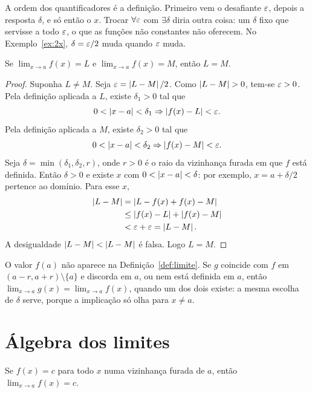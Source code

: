 \documentclass[11pt,a4paper]{article}
\begin{document}
A ordem dos quantificadores \'e a defini\c{c}\~ao. Primeiro vem o desafiante $\varepsilon$, depois a resposta $\delta$, e s\'o ent\~ao o $x$. Trocar $\forall\varepsilon$ com $\exists\delta$ diria outra coisa: um $\delta$ fixo que servisse a todo $\varepsilon$, o que as fun\c{c}\~oes n\~ao constantes n\~ao oferecem. No Exemplo~\ref{ex:2x}, $\delta=\varepsilon/2$ muda quando $\varepsilon$ muda.

\begin{teorema}[Unicidade]
\label{teo:unicidade}
Se $\lim_{x\to a}f(x)=L$ e $\lim_{x\to a}f(x)=M$, ent\~ao $L=M$.
\end{teorema}

\begin{proof}
Suponha $L\neq M$. Seja $\varepsilon=\left\lvert L-M \right\rvert/2$. Como $\left\lvert L-M \right\rvert>0$, tem-se $\varepsilon>0$. Pela defini\c{c}\~ao aplicada a $L$, existe $\delta_1>0$ tal que
\[
0<\left\lvert x-a \right\rvert<\delta_1 \Rightarrow \left\lvert f(x)-L \right\rvert<\varepsilon.
\]
Pela defini\c{c}\~ao aplicada a $M$, existe $\delta_2>0$ tal que
\[
0<\left\lvert x-a \right\rvert<\delta_2 \Rightarrow \left\lvert f(x)-M \right\rvert<\varepsilon.
\]
Seja $\delta=\min(\delta_1,\delta_2,r)$, onde $r>0$ \'e o raio da vizinhan\c{c}a furada em que $f$ est\'a definida. Ent\~ao $\delta>0$ e existe $x$ com $0<\left\lvert x-a \right\rvert<\delta$: por exemplo, $x=a+\delta/2$ pertence ao dom\'inio. Para esse $x$,
\begin{align*}
\left\lvert L-M \right\rvert
&=\left\lvert L-f(x)+f(x)-M \right\rvert\\
&\le \left\lvert f(x)-L \right\rvert+\left\lvert f(x)-M \right\rvert\\
&<\varepsilon+\varepsilon
=\left\lvert L-M \right\rvert.
\end{align*}
A desigualdade $\left\lvert L-M \right\rvert<\left\lvert L-M \right\rvert$ \'e falsa. Logo $L=M$.
\end{proof}

\begin{observacao}
O valor $f(a)$ n\~ao aparece na Defini\c{c}\~ao~\ref{def:limite}. Se $g$ coincide com $f$ em $(a-r,a+r)\setminus\{a\}$ e discorda em $a$, ou nem est\'a definida em $a$, ent\~ao $\lim_{x\to a}g(x)=\lim_{x\to a}f(x)$, quando um dos dois existe: a mesma escolha de $\delta$ serve, porque a implica\c{c}\~ao s\'o olha para $x\neq a$.
\end{observacao}

\section{\'Algebra dos limites}
\label{sec:algebra}

\begin{teorema}[Constante]
\label{teo:const}
Se $f(x)=c$ para todo $x$ numa vizinhan\c{c}a furada de $a$, ent\~ao $\lim_{x\to a}f(x)=c$.
\end{teorema}
\end{document}
